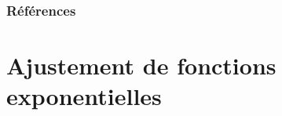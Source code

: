 \documentclass[10pt]{beamer}
\begin{document}
\appendix
{}


\begin{frame}[allowframebreaks]
  \frametitle{Références}
  
  \scriptsize{
    
  }
\end{frame}

\section{Ajustement de fonctions exponentielles}
  


\end{document}
